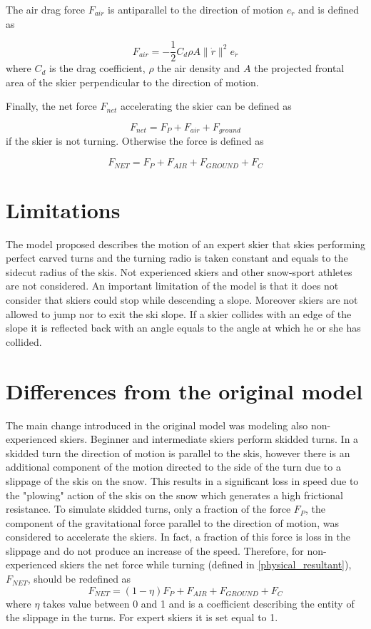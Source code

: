 \documentclass[12pt,a4paper,twoside]{book}
\newcommand{\norm}[1]{\lVert#1\rVert}
\begin{document}
The air drag force $F_{air}$ is antiparallel to the direction of motion $e_{\dot{r}}$ and is defined as

\begin{equation}
F_{air}=-\frac{1}{2}C_d \rho A \norm{\dot{r}}^2 e_{\dot{r}}
\end{equation}
where $C_d$ is the drag coefficient, $\rho$ the air density and $A$ the projected frontal area of the skier perpendicular to the direction of motion.

Finally, the net force $F_{net}$ accelerating the skier can be defined as

\begin{equation}
F_{net}=F_P + F_{air} + F_{ground}
\end{equation}
if the skier is not turning. Otherwise the force is defined as

\begin{equation}\label{physical_resultant}
F_{NET}=F_P + F_{AIR} + F_{GROUND} + F_C
\end{equation}

\section{Limitations}
The model proposed describes the motion of an expert skier that skies performing perfect carved turns and the turning radio is taken constant and equals to the sidecut radius of the skis. Not experienced skiers and other snow-sport athletes are not considered. An important limitation of the model is that it does not consider that skiers could stop while descending a slope.  Moreover skiers are not allowed to jump nor to exit the ski slope. If a skier collides with an edge of the slope it is reflected back with an angle equals to the angle at which he or she has collided.

\section{Differences from the original model}
The main change introduced in the original model was modeling also non-experienced skiers. Beginner and intermediate skiers perform skidded turns. In a skidded turn the direction of motion is parallel to the skis, however there is an additional component of the motion directed to the side of the turn due to a slippage of the skis on the snow. This results in a significant loss in speed due to the "plowing" action of the skis on the snow which generates a high frictional resistance. To simulate skidded turns, only a fraction of the force $F_P$, the component of the gravitational force parallel to the direction of motion, was considered to accelerate the skiers. In fact, a fraction of this force is loss in the slippage and do not produce an increase of the speed. Therefore, for non-experienced skiers the net force while turning (defined in \ref{physical_resultant}), $F_{NET}$, should be redefined as
\begin{equation}
F_{NET}=(1-\eta) F_P + F_{AIR} + F_{GROUND} + F_C
\end{equation}
where $\eta$ takes value between 0 and 1 and is a coefficient describing the entity of the slippage in the turns. For expert skiers it is set equal to 1.
\end{document}
